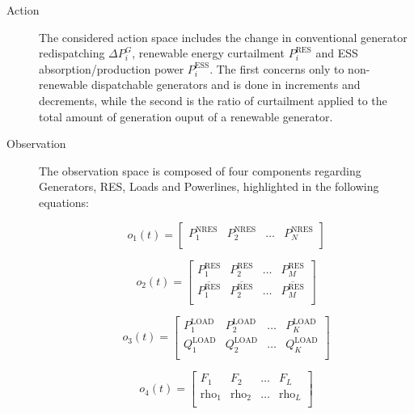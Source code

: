 \begin{description}
	\item[Action] The considered action space includes the change in conventional generator redispatching $\Delta P^G_i$, renewable energy curtailment $P^\text{RES}_i$ and \ac{ESS} absorption/production power $P^\text{ESS}_i$. The first concerns only to non-renewable dispatchable generators and is done in increments and decrements, while the second is the ratio of curtailment applied to the total amount of generation ouput of a renewable generator. \par
	
	\item[Observation] The observation space is composed of four components regarding Generators, \ac{RES}, Loads and Powerlines, highlighted in the following equations:
	

	
	\begin{equation} \label{eq:simple-obs-space1}
		o_{1}(t)= \begin{bmatrix}
			P^\text{NRES}_1 & P^\text{NRES}_2 & \dots & P^\text{NRES}_{N} \\
		\end{bmatrix}
	\end{equation}
	
	\begin{equation} \label{eq:simple-obs-space2}
		o_{2}(t)= \begin{bmatrix}
			P^\text{RES}_1 & P^\text{RES}_2 & \dots & P^\text{RES}_{M} \\
			\overline{P^\text{RES}_1} & \overline{P^\text{RES}_2} & \dots & \overline{P^\text{RES}_{M}} \\
		\end{bmatrix}
	\end{equation}
	
	\begin{equation} \label{eq:simple-obs-space3}
		o_{3}(t)= \begin{bmatrix}
			P^\text{LOAD}_1 & P^\text{LOAD}_2 & \dots & P^\text{LOAD}_{K} \\
			Q^\text{LOAD}_1 & Q^\text{LOAD}_2 & \dots & Q^\text{LOAD}_{K} \\
		\end{bmatrix}
	\end{equation}
	
	\begin{equation} \label{eq:simple-obs-space4}
		o_{4}(t)= \begin{bmatrix}
			F_1 & F_2 & \dots & F_{L} \\
			\text{rho}_1 & \text{rho}_2 & \dots & \text{rho}_{L} \\
		\end{bmatrix}
	\end{equation}
	

\end{description}
